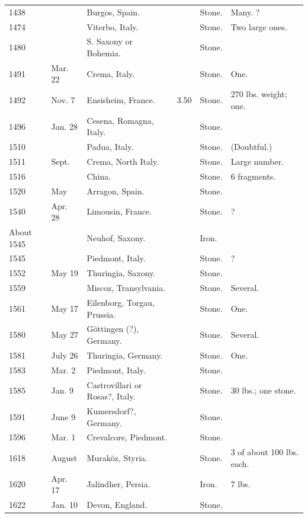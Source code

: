 \documentclass[a4paper, 12pt, oneside]{article}
\begin{document}
\begin{center}
\begin{longtable}{|p{10mm}|p{15mm}|p{32mm}|p{13mm}|p{13mm}|p{26mm}|}
        1438 & ~ & Burgos, Spain. & ~ & Stone. & Many. ? \\
        1474 & ~ & Viterbo, Italy. & ~ & Stone. & Two large ones. \\
        1480 & ~ & S. Saxony or Bohemia. & ~ & Stone. & ~ \\
        1491 & Mar. 22 & Crema, Italy. & ~ & Stone. & One. \\
        1492 & Nov. 7 & Ensisheim, France. & 3.50 & Stone. & 270 lbs. weight; one. \\
        1496 & Jan. 28 & Cesena, Romagna, Italy. & ~ & Stone. & ~ \\
        1510 & ~ & Padua, Italy. & ~ & Stone. & (Doubtful.) \\
        1511 & Sept. & Crema, North Italy. & ~ & Stone. & Large number. \\
        1516 & ~ & China. & ~ & Stone. & 6 fragments. \\
        1520 & May & Arragon, Spain. & ~ & Stone. & ~ \\
        1540 & Apr. 28 & Limousin, France. & ~ & Stone. & ? \\
        About 1545 & ~ & Neuhof, Saxony. & ~ & Iron. & ~ \\
        1545 & ~ & Piedmont, Italy. & ~ & Stone. & ? \\
        1552 & May 19 & Thuringia, Saxony. & ~ & Stone. & ~ \\
        1559 & ~ & Miscoz, Transylvania. & ~ & Stone. & Several. \\
        1561 & May 17 & Eilenborg, Torgau, Prussia. & ~ & Stone. & One. \\
        1580 & May 27 & Göttingen (?), Germany. & ~ & Stone. & Several. \\
        1581 & July 26 & Thuringia, Germany. & ~ & Stone. & One. \\
        1583 & Mar. 2 & Piedmont, Italy. & ~ & Stone. & ~ \\
        1585 & Jan. 9 & Castrovillari or Rosas?, Italy. & ~ & Stone. & 30 lbs.; one stone. \\
        1591 & June 9 & Kumersdorf?, Germany. & ~ & Stone. & ~ \\
        1596 & Mar. 1 & Crevalcore, Piedmont. & ~ & Stone. & ~ \\
        1618 & August & Muraköz, Styria. & ~ & Stone. & 3 of about 100 lbs. each. \\
        1620 & Apr. 17 & Jalindher, Persia. & ~ & Iron. & 7 lbs. \\
        1622 & Jan. 10 & Devon, England. & ~ & Stone. & ~ \\

\end{longtable}
\end{center}
\end{document}
